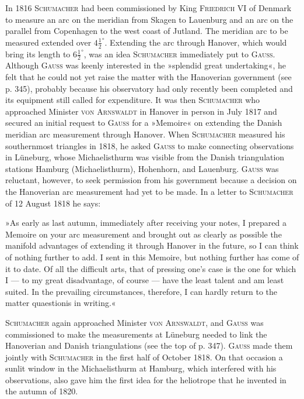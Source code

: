 \par\noindent\hspace*{\parindent}In 1816 \textsc{Schumacher} had been commissioned by King \textsc{Friedrich} VI of Denmark to measure an arc on the meridian from Skagen to Lauenburg and an arc on the parallel from Copenhagen to the west coast of Jutland. The meridian arc to be measured extended over $4\frac12^\circ$. Extending the arc through Hanover, which would bring its length to $6\frac12^\circ$, was an idea \textsc{Schumacher} immediately put to \textsc{Gauss}. Although \textsc{Gauss} was keenly interested in the »splendid great undertaking«, he felt that he could not yet raise the matter with the Hanoverian government (see p. 345), probably because his observatory had only recently been completed and its equipment still called for expenditure. It was then \textsc{Schumacher} who approached Minister \textsc{von Arnswaldt} in Hanover in person in July 1817 and secured an initial request to \textsc{Gauss} for a »Memoire« on extending the Danish meridian arc measurement through Hanover. When \textsc{Schumacher} measured his southernmost triangles in 1818, he asked \textsc{Gauss} to make connecting observations in Lüneburg, whose Michaelisthurm was visible from the Danish triangulation stations Hamburg (Michaelisthurm), Hohenhorn, and Lauenburg. \textsc{Gauss} was reluctant, however, to seek permission from his government because a decision on the Hanoverian arc measurement had yet to be made. In a letter to \textsc{Schumacher} of 12 August 1818 he says:

\par\noindent\hspace*{\parindent}»As early as last autumn, immediately after receiving your notes, I prepared a Memoire on your arc measurement and brought out as clearly as possible the manifold advantages of extending it through Hanover in the future, so I can think of nothing further to add. I sent in this Memoire, but nothing further has come of it to date. Of all the difficult arts, that of pressing one's case is the one for which I --- to my great disadvantage, of course --- have the least talent and am least suited. In the prevailing circumstances, therefore, I can hardly return to the matter quaestionis in writing.«

\par\noindent\hspace*{\parindent}\textsc{Schumacher} again approached Minister \textsc{von Arnswaldt}, and \textsc{Gauss} was commissioned to make the measurements at Lüneburg needed to link the Hanoverian and Danish triangulations (see the top of p. 347). \textsc{Gauss} made them jointly with \textsc{Schumacher} in the first half of October 1818. On that occasion a sunlit window in the Michaelisthurm at Hamburg, which interfered with his observations, also gave him the first idea for the heliotrope that he invented in the autumn of 1820.

